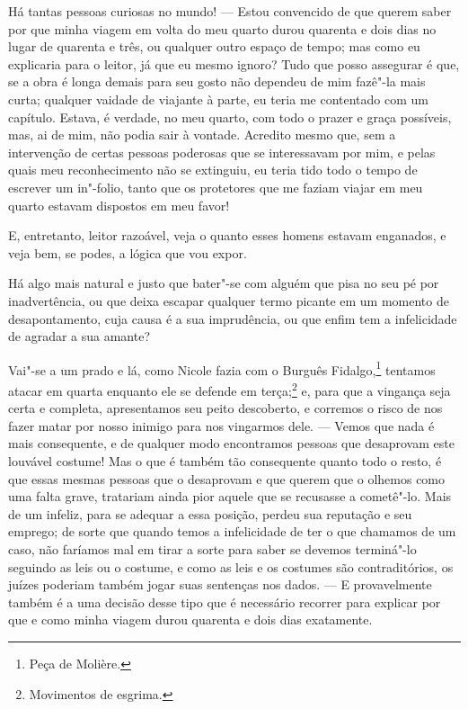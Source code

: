 Há tantas pessoas curiosas no mundo! --- Estou convencido de que querem
saber por que minha viagem em volta do meu quarto durou quarenta e dois
dias no lugar de quarenta e três, ou qualquer outro espaço de tempo;
mas como eu explicaria para o leitor, já que eu mesmo ignoro? Tudo que
posso assegurar é que, se a obra é longa demais para seu gosto não
dependeu de mim fazê"-la mais curta; qualquer vaidade de viajante à
parte, eu teria me contentado com um capítulo. Estava, é verdade, no
meu quarto, com todo o prazer e graça possíveis, mas, ai de mim, não
podia sair à vontade. Acredito mesmo que, sem a intervenção de certas
pessoas poderosas que se interessavam por mim, e pelas quais meu
reconhecimento não se extinguiu, eu teria tido todo o tempo de escrever
um in"-folio, tanto que os protetores que me faziam viajar em meu quarto
estavam dispostos em meu favor!

E, entretanto, leitor razoável, veja o quanto esses homens estavam
enganados, e veja bem, se podes, a lógica que vou expor.

 Há algo mais natural e justo que bater"-se com alguém que pisa no seu pé
por inadvertência, ou que deixa escapar qualquer termo picante em um
momento de desapontamento, cuja causa é a sua imprudência, ou que enfim
tem a infelicidade de agradar a sua amante?

 Vai"-se a um prado e lá, como Nicole fazia com o Burguês
Fidalgo,\footnote{ Peça de Molière.} tentamos atacar em quarta
enquanto ele se defende em terça;\footnote{ Movimentos de esgrima.} 
e, para que a vingança seja certa e completa, apresentamos seu
peito descoberto, e corremos o risco de nos fazer matar por nosso
inimigo para nos vingarmos dele. --- Vemos que nada é mais consequente,
e de qualquer modo encontramos pessoas que desaprovam este louvável
costume! Mas o que é também tão consequente quanto todo o resto, é que
essas mesmas pessoas que o desaprovam e que querem que o olhemos como
uma falta grave, tratariam ainda pior aquele que se recusasse a
cometê"-lo. Mais de um infeliz, para se adequar a essa posição, perdeu
sua reputação e seu emprego; de sorte que quando temos a infelicidade
de ter o que chamamos de um caso, não faríamos mal em tirar a sorte
para saber se devemos terminá"-lo seguindo as leis ou o costume, e como
as leis e os costumes são contraditórios, os juízes poderiam também
jogar suas sentenças nos dados. --- E provavelmente também é a uma
decisão desse tipo que é necessário recorrer para explicar por que e
como minha viagem durou quarenta e dois dias exatamente.

